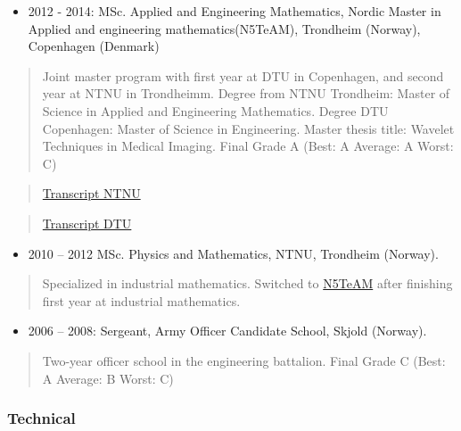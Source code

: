\documentclass[11pt, a4paper]{article}
\providecommand{\tightlist}{%
  \setlength{\itemsep}{0pt}\setlength{\parskip}{0pt}}
\begin{document}
\begin{raggedright}
\begin{itemize}
\tightlist
\item
  2012 - 2014: MSc. Applied and Engineering Mathematics, Nordic Master
  in Applied and engineering mathematics(N5TeAM), Trondheim (Norway),
  Copenhagen (Denmark)
\end{itemize}

\begin{quote}
Joint master program with first year at DTU in Copenhagen, and second
year at NTNU in Trondheimm. Degree from NTNU Trondheim: Master of
Science in Applied and Engineering Mathematics. Degree DTU Copenhagen:
Master of Science in Engineering. Master thesis title: Wavelet
Techniques in Medical Imaging. Final Grade A (Best: A Average: A Worst:
C)
\end{quote}

\begin{quote}
\href{/assets/cv/transcripts_NTNU.pdf}{Transcript NTNU}
\end{quote}

\begin{quote}
\href{/assets/cv/transcripts_DTU.pdf}{Transcript DTU}
\end{quote}

\begin{itemize}
\tightlist
\item
  2010 -- 2012 MSc. Physics and Mathematics, NTNU, Trondheim (Norway).
\end{itemize}

\begin{quote}
Specialized in industrial mathematics. Switched to
\href{http://n5team.aalto.fi/en/}{N5TeAM} after finishing first year at
industrial mathematics.
\end{quote}

\begin{itemize}
\tightlist
\item
  2006 -- 2008: Sergeant, Army Officer Candidate School, Skjold
  (Norway).
\end{itemize}

\begin{quote}
Two-year officer school in the engineering battalion. Final Grade C
(Best: A Average: B Worst: C)
\end{quote}

\hypertarget{technical}{%
\subsubsection{Technical}\label{technical}}


\end{raggedright}
\end{document}
